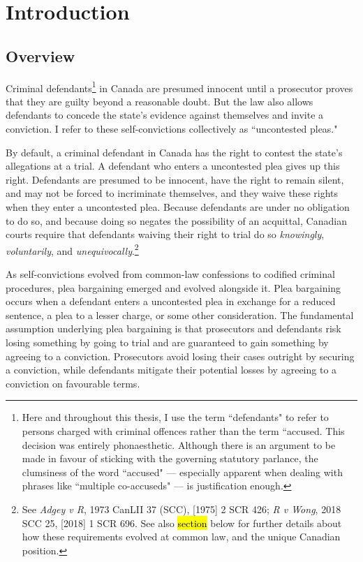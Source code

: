 \chapter{Introduction}

\section{Overview}

Criminal defendants\footnote{Here and throughout this thesis, I use the term ``defendants" to refer to persons charged with criminal offences rather than the term ``accused. This decision was entirely phonaesthetic. Although there is an argument to be made in favour of sticking with the governing statutory parlance, the clumsiness of the word ``accused" — especially apparent when dealing with phrases like ``multiple co-accuseds" — is justification enough.} in Canada are presumed innocent until a prosecutor proves that they are guilty beyond a reasonable doubt. But the law also allows defendants to concede the state's evidence against themselves and invite a conviction. I refer to these self-convictions collectively as ``uncontested pleas."

By default, a criminal defendant in Canada has the right to contest the state's allegations at a trial. A defendant who enters a uncontested plea gives up this right. Defendants are presumed to be innocent, have the right to remain silent, and may not be forced to incriminate themselves, and they waive these rights when they enter a uncontested plea. Because defendants are under no obligation to do so, and because doing so negates the possibility of an acquittal, Canadian courts require that defendants waiving their right to trial do so \textit{knowingly}, \textit{voluntarily}, and \textit{unequivocally}.\footnote{See \textit{Adgey v R}, 1973 CanLII 37 (SCC), [1975] 2 SCR 426; \textit{R v Wong}, 2018 SCC 25, [2018] 1 SCR 696. See also \hl{section} below for further details about how these requirements evolved at common law, and the unique Canadian position.}

As self-convictions evolved from common-law confessions to codified criminal procedures, plea bargaining emerged and evolved alongside it. Plea bargaining occurs when a defendant enters a uncontested plea in exchange for a reduced sentence, a plea to a lesser charge, or some other consideration. The fundamental assumption underlying plea bargaining is that prosecutors and defendants risk losing something by going to trial and are guaranteed to gain something by agreeing to a conviction. Prosecutors avoid losing their cases outright by securing a conviction, while defendants mitigate their potential losses by agreeing to a conviction on favourable terms.

